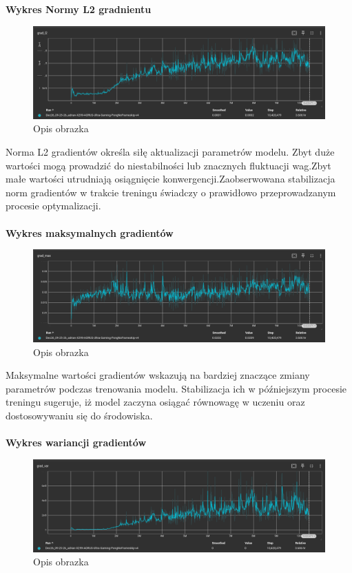 \documentclass[a4paper, 12pt]{article}
\numberwithin{equation}{section}
\begin{document}
    \\ \\ 
    \textbf{Wykres Normy L2 gradnientu}
    \begin{figure}[H]
        \centering
        \includegraphics[width=\textwidth]{pictures/A2C_grad_l2.png}
        \caption{Opis obrazka}
    \end{figure}
    Norma L2 gradientów określa siłę aktualizacji parametrów modelu. Zbyt duże wartości mogą prowadzić do niestabilności lub znacznych fluktuacji wag.Zbyt małe wartości utrudniają osiągnięcie konwergencji.Zaobserwowana stabilizacja norm gradientów w trakcie treningu świadczy o prawidłowo przeprowadzanym procesie optymalizacji.
    \\ \\ 
    \textbf{Wykres maksymalnych gradientów}
    \begin{figure}[H]
        \centering
        \includegraphics[width=\textwidth]{pictures/A2C_grad_max.png}
        \caption{Opis obrazka}
    \end{figure}
    Maksymalne wartości gradientów wskazują na bardziej znaczące zmiany parametrów podczas trenowania modelu. Stabilizacja ich w późniejszym procesie treningu sugeruje, iż model zaczyna osiągać równowagę w uczeniu oraz dostosowywaniu się do środowiska.
    \\ \\ 
    \textbf{Wykres wariancji gradientów}
    \begin{figure}[H]
        \centering
        \includegraphics[width=\textwidth]{pictures/A2C_grad_var.png}
        \caption{Opis obrazka}
    \end{figure}
\end{document}
